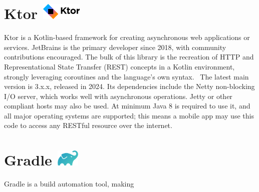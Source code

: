 \section{Ktor {\hspace{1cm}\includegraphics[height=8mm, keepaspectratio]{images/ktor_logo.png}}}

Ktor is a Kotlin-based framework for creating asynchronous web applications or services. JetBrains is the primary developer since 2018, with community contributions encouraged. The bulk of this library is the recreation of HTTP and Representational State Transfer (REST) concepts in a Kotlin environment, strongly leveraging coroutines and the language's own syntax.~\cite{KtorDocs} The latest main version is 3.x.x, released in 2024. Its dependencies include the Netty non-blocking I/O server, which works well with asynchronous operations. Jetty or other compliant hosts may also be used. At minimum Java 8 is required to use it, and all major operating systems are supported; this means a mobile app may use this code to access any RESTful resource over the internet.

\section{Gradle {\hspace{1cm}\includegraphics[height=8mm, keepaspectratio]{images/gradle_logo.png}}}

Gradle is a build automation tool, making 
